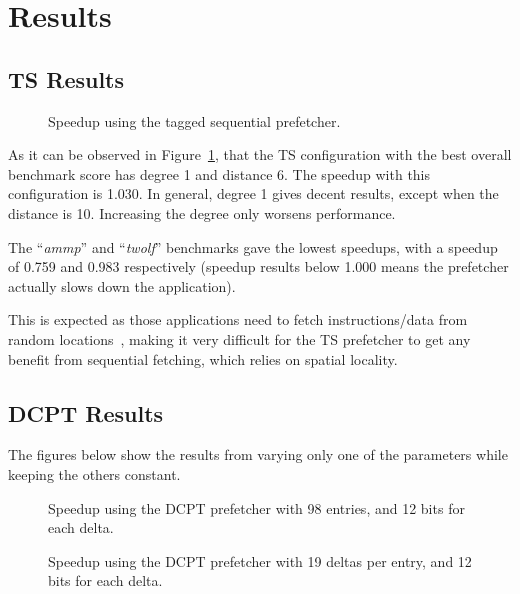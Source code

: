 \section{Results}
\label{sec:res}

\subsection{TS Results}

\begin{figure}[h!]
	\begin{centering}
		
		\caption{Speedup using the tagged sequential prefetcher.}
		\label{figure:ts}
	\end{centering}
\end{figure}

As it can be observed in Figure~\ref{figure:ts}, that the TS configuration with
the best overall benchmark score has degree 1 and distance 6. The speedup with
this configuration is 1.030. In general, degree 1 gives decent results, except
when the distance is 10. Increasing the degree only worsens performance.

The ``\emph{ammp}'' and ``\emph{twolf}'' benchmarks gave the lowest speedups,
with a speedup of 0.759 and 0.983 respectively (speedup results below 1.000
means the prefetcher actually slows down the application).

This is expected as those applications need to fetch instructions/data from
random locations~\cite[Sec.~4.2]{spec2000-memory}, making it very difficult for
the TS prefetcher to get any benefit from sequential fetching, which relies on
spatial locality.

\subsection{DCPT Results}

The figures below show the results from varying only one of the parameters while
keeping the others constant.

\begin{figure}[h!]
	\begin{centering}
		
		\caption{Speedup using the DCPT prefetcher with 98 entries, and 12 bits for each delta.}
		\label{figure:dcpt-num-deltas}
	\end{centering}
\end{figure}

\begin{figure}[h!]
	\begin{centering}
		
		\caption{Speedup using the DCPT prefetcher with 19 deltas per entry, and 12 bits for each delta.}
		\label{figure:dcpt-table-size}
	\end{centering}
\end{figure}

